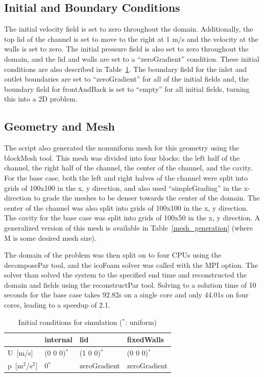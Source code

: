 \documentclass[twocolumn,10pt]{asme2ej}
\begin{document}
\subsection{Initial and Boundary Conditions}
The initial velocity field is set to zero throughout the domain. Additionally, the top lid of the channel is set to move to the right at 1 m/s and the velocity at the walls is set to zero. The initial pressure field is also set to zero throughout the domain, and the lid and walls are set to a ``zeroGradient'' condition. These initial conditions are also described in Table~\ref{initial_conditions}. The boundary field for the inlet and outlet boundaries are set to ``zeroGradient'' for all of the initial fields and, the boundary field for frontAndBack is set to ``empty'' for all initial fields, turning this into a 2D problem.

\subsection{Geometry and Mesh}
The script also generated the nonuniform mesh for this geometry using the blockMesh tool. This mesh was divided into four blocks: the left half of the channel, the right half of the channel, the center of the channel, and the cavity. For the base case, both the left and right halves of the channel were split into grids of 100x100 in the x, y direction, and also used ``simpleGrading'' in the x-direction to grade the meshes to be denser towards the center of the domain. The center of the channel was also split into grids of 100x100 in the x, y direction. The cavity for the base case was split into grids of 100x50 in the x, y direction. A generalized version of this mesh is available in Table~\ref{mesh_generation} (where M is some desired mesh size).

The domain of the problem was then split on to four CPUs using the decomposePar tool, and the icoFoam solver was called with the MPI option. The solver than solved the system to the specified end time and reconstructed the domain and fields using the reconstructPar tool. Solving to a solution time of 10 seconds for the base case takes 92.82s on a single core and only 44.01s on four cores, leading to a speedup of 2.1.

\begin{table}[tb]
\begin{center}
\begin{tabular}{| l | l | l | l | }
\hline
                & internal    & lid          & fixedWalls   \\
\hline
U~[m/s]         & (0 0 0)$^*$ & (1 0 0)$^*$  & (0 0 0)$^*$  \\
p~[m$^2$/s$^2$] & 0$^*$       & zeroGradient & zeroGradient \\
\hline
\end{tabular}
\caption{Initial conditions for simulation ($^*$: uniform)}
\label{initial_conditions}
\end{center}
\end{table}
\end{document}
